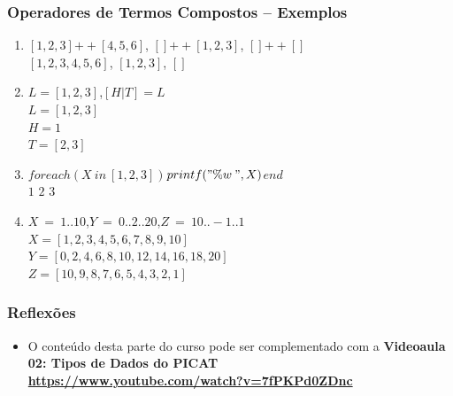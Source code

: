 \begin{frame}[fragile]
\frametitle{Operadores de Termos Compostos -- Exemplos}

    \begin{block}{}
		
        \begin{enumerate}
        
			\item $[1,2,3]$\:$++$\:$[4,5,6]$, \: $[]$\:$++$\:$[1,2,3]$, \: $[]$\:$++$\:$[]$\\
            \pause
            $[1,2,3,4,5,6]$, \:$[1,2,3]$, \:$[]$

            \pause
            \item $L = [1,2,3]$,\:\:$[H|T] = L$\\
            \pause
            $L = [1,2,3]$\\ \pause
            $H = 1$\\ \pause
            $T = [2,3]$
            
            \pause
            \item $foreach(X\:in\:[1,2,3])$\:\:$printf("\%w\:",X)$\:\:$end$\\
            \pause
            $1$ $2$ $3$

            \pause
            \item $X\:=\:1..10$,\:\:$Y\:=\:0..2..20$,\:\:$Z\:=\:10..-1..1$\\
            
            \pause
            $X = [1,2,3,4,5,6,7,8,9,10]$\\ 
            
            \pause
            $Y = [0,2,4,6,8,10,12,14,16,18,20]$\\
            \pause
            $Z = [10,9,8,7,6,5,4,3,2,1]$
            
		\end{enumerate}
        
	\end{block}
    
\end{frame}

\begin{frame}[fragile]
\frametitle{Reflexões}

\begin{itemize}


  \item O conteúdo desta parte do curso pode ser complementado
  com a   \textbf{Videoaula 02: Tipos de Dados do PICAT}\\
    \textbf{\url {https://www.youtube.com/watch?v=7fPKPd0ZDnc}} 

\end{itemize}

\end{frame}

